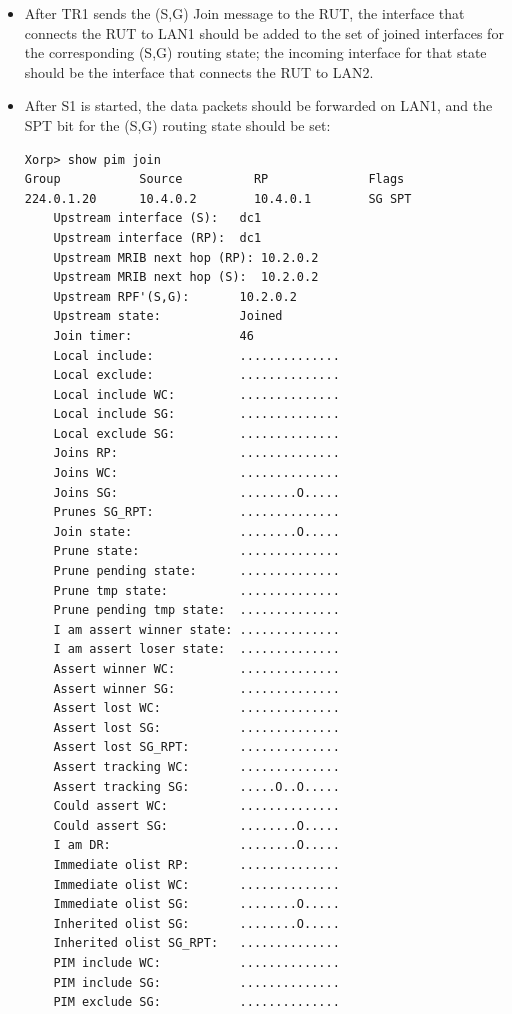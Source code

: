 \documentclass[11pt]{report}
\begin{document}
\begin{itemize}

  \item After TR1 sends the (S,G) Join message to the RUT, the interface that
  connects the RUT to LAN1 should be added to the set of joined interfaces for
  the corresponding (S,G) routing state; the incoming interface for that state
  should be the interface that connects the RUT to LAN2.

  \item After S1 is started, the data packets should be forwarded on LAN1,
  and the SPT bit for the (S,G) routing state should be set:

\begin{verbatim}
Xorp> show pim join 
Group           Source          RP              Flags
224.0.1.20      10.4.0.2        10.4.0.1        SG SPT 
    Upstream interface (S):   dc1
    Upstream interface (RP):  dc1
    Upstream MRIB next hop (RP): 10.2.0.2
    Upstream MRIB next hop (S):  10.2.0.2
    Upstream RPF'(S,G):       10.2.0.2
    Upstream state:           Joined 
    Join timer:               46
    Local include:            ..............
    Local exclude:            ..............
    Local include WC:         ..............
    Local include SG:         ..............
    Local exclude SG:         ..............
    Joins RP:                 ..............
    Joins WC:                 ..............
    Joins SG:                 ........O.....
    Prunes SG_RPT:            ..............
    Join state:               ........O.....
    Prune state:              ..............
    Prune pending state:      ..............
    Prune tmp state:          ..............
    Prune pending tmp state:  ..............
    I am assert winner state: ..............
    I am assert loser state:  ..............
    Assert winner WC:         ..............
    Assert winner SG:         ..............
    Assert lost WC:           ..............
    Assert lost SG:           ..............
    Assert lost SG_RPT:       ..............
    Assert tracking WC:       ..............
    Assert tracking SG:       .....O..O.....
    Could assert WC:          ..............
    Could assert SG:          ........O.....
    I am DR:                  ........O.....
    Immediate olist RP:       ..............
    Immediate olist WC:       ..............
    Immediate olist SG:       ........O.....
    Inherited olist SG:       ........O.....
    Inherited olist SG_RPT:   ..............
    PIM include WC:           ..............
    PIM include SG:           ..............
    PIM exclude SG:           ..............
\end{verbatim}


\end{itemize}
\end{document}
